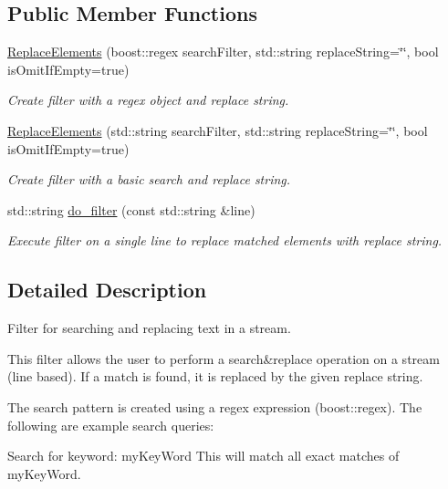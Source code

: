 \subsection*{Public Member Functions}
\begin{DoxyCompactItemize}
\item 
\hyperlink{classtudat_1_1input__output_1_1stream__filters_1_1ReplaceElements_aa18b9e1b18df2d4cf0873637f2f647cc}{Replace\+Elements} (boost\+::regex search\+Filter, std\+::string replace\+String=\char`\"{}\char`\"{}, bool is\+Omit\+If\+Empty=true)
\begin{DoxyCompactList}\small\item\em Create filter with a regex object and replace string. \end{DoxyCompactList}\item 
\hyperlink{classtudat_1_1input__output_1_1stream__filters_1_1ReplaceElements_aa29f1fd05b29803c0d4d64bfa609b1d8}{Replace\+Elements} (std\+::string search\+Filter, std\+::string replace\+String=\char`\"{}\char`\"{}, bool is\+Omit\+If\+Empty=true)
\begin{DoxyCompactList}\small\item\em Create filter with a basic search and replace string. \end{DoxyCompactList}\item 
std\+::string \hyperlink{classtudat_1_1input__output_1_1stream__filters_1_1ReplaceElements_ab74a73729a02c25a48413b02b1ff2961}{do\+\_\+filter} (const std\+::string \&line)
\begin{DoxyCompactList}\small\item\em Execute filter on a single line to replace matched elements with replace string. \end{DoxyCompactList}\end{DoxyCompactItemize}


\subsection{Detailed Description}
Filter for searching and replacing text in a stream. 

This filter allows the user to perform a search\&replace operation on a stream (line based). If a match is found, it is replaced by the given replace string.

The search pattern is created using a regex expression (boost\+::regex). The following are example search queries\+:

Search for keyword\+: \textquotesingle{}my\+Key\+Word\textquotesingle{} This will match all exact matches of \textquotesingle{}my\+Key\+Word\textquotesingle{}.

